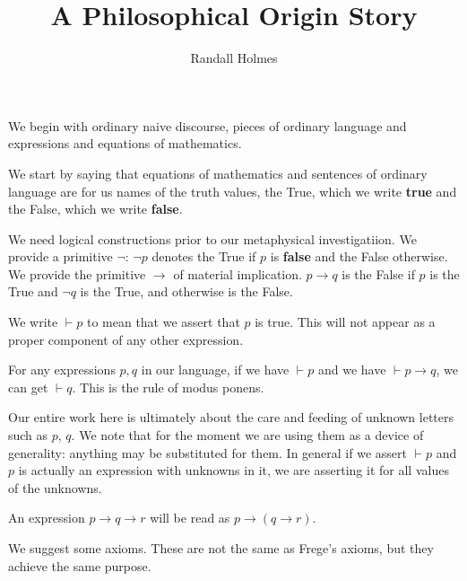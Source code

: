 \documentclass[12pt]{article}
\title{A Philosophical Origin Story}
\author{Randall Holmes}
\begin{document}
\maketitle

We begin with ordinary naive discourse, pieces of ordinary language and expressions and equations of mathematics.

We start by saying that equations of mathematics and sentences of ordinary language are for us names of the truth values, the True, which we write {\bf true}
and the False, which we write {\bf false}.

We need logical constructions prior to our metaphysical investigatiion.  We provide a primitive $\neg$:  $\neg p$ denotes the True if $p$ is {\bf false} and 
the False otherwise.  We provide the primitive $\rightarrow$ of material implication.  $p \rightarrow q$ is the False if $p$ is the True and $\neg q$ is the True, and otherwise is the False.

We write $\vdash p$ to mean that we assert that $p$ is true.  This will not appear as a proper component of any other expression.

For any expressions $p,q$ in our language, if we have $\vdash p$ and we have $\vdash p \rightarrow q$, we can get $\vdash q$.  This is the rule of modus ponens.

Our entire work here is ultimately about the care and feeding of unknown letters such as $p$, $q$.  We note that for the moment we are using them as a device of generality:
anything may be substituted for them.  In general if we assert $\vdash p$ and $p$ is actually an expression with unknowns in it, we are asserting it for all values of the unknowns.

An expression $p\rightarrow q\rightarrow r$ will be read as $p \rightarrow (q \rightarrow r)$.

We suggest some axioms.  These are not the same as Frege's axioms, but they achieve the same purpose.
\end{document}
